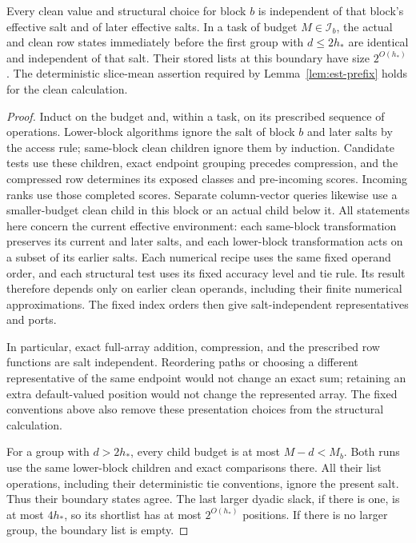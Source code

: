 \begin{lemma}\label{lem:fp-clean}
Every clean value and structural choice for block $b$ is independent of
that block's effective salt and of later effective salts.  In a task of
budget $M\in\mathcal I_b$, the actual and clean row states immediately before
the first group with $d\le2h_*$ are identical and independent of that
salt.  Their stored lists at this boundary have size $2^{O(h_*)}$.
The deterministic slice-mean assertion required by
Lemma~\ref{lem:est-prefix} holds for the clean calculation.
\end{lemma}

\begin{proof}
Induct on the budget and, within a task, on its prescribed sequence of
operations.  Lower-block algorithms ignore the salt of block $b$ and
later salts by the access rule; same-block clean children ignore them
by induction.  Candidate tests use these children, exact endpoint
grouping precedes compression, and the compressed row determines its
exposed classes and pre-incoming scores.  Incoming ranks use those
completed scores.  Separate column-vector queries likewise use a
smaller-budget clean child in this block or an actual child below it.
All statements here concern the current effective environment: each
same-block transformation preserves its current and later salts, and
each lower-block transformation acts on a subset of its earlier salts.
Each numerical recipe uses the same fixed operand
order, and each structural test uses its fixed accuracy level and tie
rule.  Its result therefore depends only on earlier clean operands,
including their finite numerical approximations.  The fixed index
orders then give salt-independent representatives and ports.

In particular, exact full-array addition, compression, and the prescribed
row functions are salt independent.  Reordering paths or choosing a
different representative of the same endpoint would not change an exact
sum; retaining an extra default-valued position would not change the
represented array.  The fixed conventions above also remove these
presentation choices from the structural calculation.

For a group with $d>2h_*$, every child budget is at most $M-d<M_b$.
Both runs use the same lower-block children and exact comparisons there.
All their list operations, including their deterministic tie conventions,
ignore the present salt.  Thus their boundary states agree.  The last
larger dyadic slack, if there is one, is at most $4h_*$, so its shortlist
has at most $2^{O(h_*)}$ positions.  If there is no larger group, the
boundary list is empty.


\end{proof}
